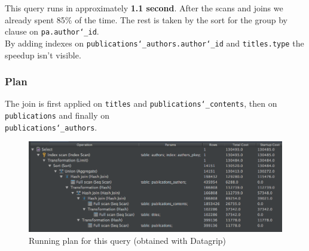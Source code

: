 \documentclass[doubleside, titlepage]{article}
\begin{document}
This query runs in approximately \textbf{1.1 second}. After the scans and joins we already spent 85\% of the time. The rest is taken by the sort for the group by clause on \texttt{pa.author\char`_id}.~\\ By adding indexes on \texttt{publications\char`_authors.author\char`_id} and \texttt{titles.type} the speedup isn't visible.


\subsubsection{Plan}
The join is first applied on \texttt{titles} and \texttt{publications\char`_contents}, then on \texttt{publications} and finally on ~\\ \texttt{publications\char`_authors}.

\begin{figure}[!htb]
	\centering
    \includegraphics[scale = 0.5]{./query_analysis/query21}
    \caption{Running plan for this query (obtained with Datagrip)}
\end{figure}
\end{document}
